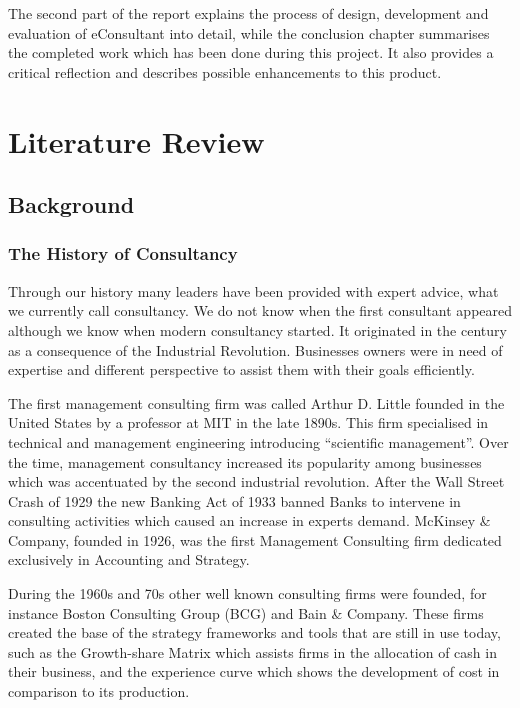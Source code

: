 \documentclass{article}
\begin{document}
{\large 
The second part of the report explains the process of design, development and evaluation of eConsultant into detail, while the conclusion chapter summarises the completed work which has been done during this project. It also provides a critical reflection and describes possible enhancements to this product.\par
}

\newpage
\section{Literature Review}

\subsection{Background}
\subsubsection{The History of Consultancy}
{\large
Through our history many leaders have been provided with expert advice, what we currently call consultancy. We do not know when the first consultant appeared although we know when modern consultancy started. It originated in the  century as a consequence of the Industrial Revolution. Businesses owners were in need of expertise and different perspective to assist them with their goals efficiently. \par
}

{\large
The first management consulting firm was called Arthur D. Little founded in the United States by a professor at MIT in the late 1890s. This firm specialised in technical and management engineering introducing “scientific management”. Over the time, management consultancy increased its popularity among businesses which was accentuated by the second industrial revolution. After the Wall Street Crash of 1929 the new Banking Act of 1933 banned Banks to intervene in consulting activities which caused an increase in experts demand. McKinsey \& Company, founded in 1926, was the first Management Consulting firm dedicated exclusively in Accounting and Strategy.\par
}

{\large
During the 1960s and  70s other well known consulting firms were founded, for instance Boston Consulting Group (BCG) and Bain \& Company. These firms created the base of the strategy frameworks and tools that are still in use today, such as the Growth-share Matrix which assists firms in the allocation of cash in their business, and the experience curve which shows the development of cost in comparison to its production.\par
}
\end{document}
